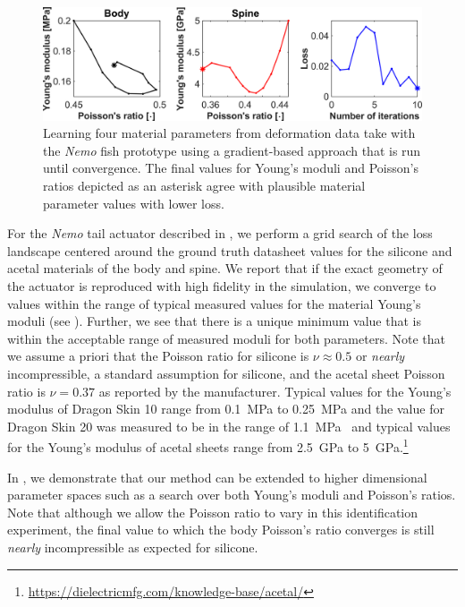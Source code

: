 \begin{figure}[t]
    \label{fig:system_id}
\end{figure}

\begin{figure}[t]
    \centering
    \includegraphics[width=0.99\columnwidth]{figures/param_search_figure_new.png}
    \caption{Learning four material parameters from deformation data take with the \textit{Nemo} fish prototype using a gradient-based approach that is run until convergence. The final values for Young's moduli and Poisson's ratios depicted as an asterisk agree with plausible material parameter values with lower loss.}
    \label{fig:4_param_search}
\end{figure}

For the \emph{Nemo} tail actuator described in , we perform a grid search of the loss landscape centered around the ground truth datasheet values for the silicone and acetal materials of the body and spine. We report that if the exact geometry of the actuator is reproduced with high fidelity in the simulation, we converge to values within the range of typical measured values for the material Young's moduli (see ). Further, we see that there is a unique minimum value that is within the acceptable range of measured moduli for both parameters. Note that we assume a priori that the Poisson ratio for silicone is $\nu\approx0.5$ or \textit{nearly} incompressible, a standard assumption for silicone, and the acetal sheet Poisson ratio is $\nu=0.37$ as reported by the manufacturer. Typical values for the Young's modulus of Dragon Skin 10 range from \SI{0.1}{MPa} to \SI{0.25}{MPa} and the value for Dragon Skin 20 was measured to be in the range of \SI{1.1}{MPa}~\cite{marechal2020toward} and typical values for the Young's modulus of acetal sheets range from \SI{2.5}{GPa} to \SI{5}{GPa}.\footnote{\url{https://dielectricmfg.com/knowledge-base/acetal/}}

In , we demonstrate that our method can be extended to higher dimensional parameter spaces such as a search over both Young's moduli and Poisson's ratios. Note that although we allow the Poisson ratio to vary in this identification experiment, the final value to which the body Poisson's ratio converges is still \textit{nearly} incompressible as expected for silicone.


